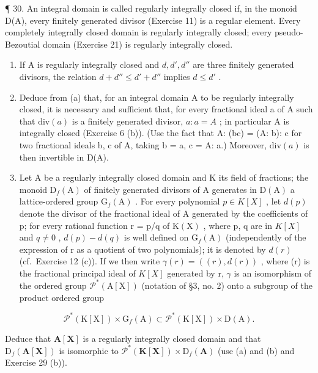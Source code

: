 ¶ 30. An integral domain is called regularly integrally closed if, in the monoid D(A), every finitely generated divisor (Exercise 11) is a regular element. Every completely integrally closed domain is regularly integrally closed; every pseudo-Bezoutial domain (Exercise 21) is regularly integrally closed.

\begin{enumerate}
\def\labelenumi{(\alph{enumi})}
\item
  If A is regularly integrally closed and \(d, d', d''\) are three finitely generated divisors, the relation \(d + d'' \leqslant d' + d''\) implies \(d \leqslant d'\) .
\item
  Deduce from (a) that, for an integral domain A to be regularly integrally closed, it is necessary and sufficient that, for every fractional ideal a of A such that \(\text{div}(a)\) is a finitely generated divisor, \(a: a = A\) ; in particular A is integrally closed (Exercise 6 (b)). (Use the fact that A: (bc) = (A: b): c for two fractional ideals b, c of A, taking b = a, c = A: a.) Moreover, \(\text{div}(a)\) is then invertible in D(A).
\item
  Let A be a regularly integrally closed domain and K its field of fractions; the monoid \(\mathrm{D}_{f}(\mathrm{A})\) of finitely generated divisors of A generates in \(\mathrm{D}(\mathrm{A})\) a lattice-ordered group \(\mathrm{G}_{f}(\mathrm{A})\) . For every polynomial \(p \in K[X]\) , let \(d(p)\) denote the divisor of the fractional ideal of A generated by the coefficients of p; for every rational function r = p/q of \(\mathrm{K}(\mathrm{X})\) , where p, q are in \(K[X]\) and \(q \neq 0\) , \(d(p) - d(q)\) is well defined on \(\mathrm{G}_{f}(\mathrm{A})\) (independently of the expression of r as a quotient of two polynomials); it is denoted by \(d(r)\) (cf.~Exercise 12 (c)). If we then write \(\gamma(r) = ((r), d(r))\) , where (r) is the fractional principal ideal of \(K[X]\) generated by r, \(\gamma\) is an isomorphism of the ordered group \(\mathcal{P}^{*}(\mathrm{A}[\mathrm{X}])\) (notation of §3, no. 2) onto a subgroup of the product ordered group
\end{enumerate}

\[
\mathscr {P} ^ {*} (\mathrm{K} [ \mathrm{X} ]) \times \mathrm{G} _ {f} (\mathrm{A}) \subset \mathscr {P} ^ {*} (\mathrm{K} [ \mathrm{X} ]) \times \mathrm{D} (\mathrm{A}).
\]

Deduce that \(\mathbf{A}[\mathbf{X}]\) is a regularly integrally closed domain and that \(\mathrm{D}_f(\mathbf{A}[\mathbf{X}])\) is isomorphic to \(\mathcal{P}^* (\mathbf{K}[\mathbf{X}])\times \mathrm{D}_f(\mathbf{A})\) (use (a) and (b) and Exercise 29 (b)).

